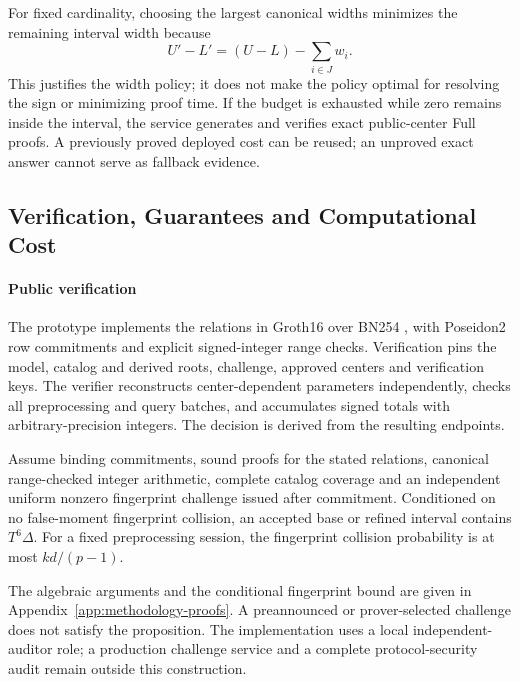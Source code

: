 For fixed cardinality, choosing the largest canonical widths minimizes the
remaining interval width because
\begin{equation}
 U'-L'=(U-L)-\sum_{i\in J}w_i.
 \label{eq:methodology-width}
\end{equation}
This justifies the width policy; it does not make the policy optimal for
resolving the sign or minimizing proof time. If the budget is exhausted
while zero remains inside the interval, the service generates and verifies
exact public-center Full proofs. A previously proved deployed cost can be
reused; an unproved exact answer cannot serve as fallback evidence.

\subsection{Verification, Guarantees and Computational Cost}
\label{sec:methodology-guarantees}
\paragraph{Public verification}
The prototype implements the relations in Groth16 over BN254
\cite{groth2016}, with Poseidon2 row commitments and explicit signed-integer
range checks. Verification pins the model, catalog and derived roots,
challenge, approved centers and verification keys. The verifier reconstructs
center-dependent parameters independently, checks all preprocessing and
query batches, and accumulates signed totals with arbitrary-precision
integers. The decision is derived from the resulting endpoints.

\begin{proposition}
\label{prop:methodology-correctness}
Assume binding commitments, sound proofs for the stated relations, canonical
range-checked integer arithmetic, complete catalog coverage and an independent
uniform nonzero fingerprint challenge issued after commitment. Conditioned on
no false-moment fingerprint collision, an accepted base or refined interval
contains $T^6\Delta$. For a fixed preprocessing session, the fingerprint
collision probability is at most $kd/(p-1)$.
\end{proposition}
The algebraic arguments and the conditional fingerprint bound are given in
Appendix~\ref{app:methodology-proofs}. A preannounced or prover-selected
challenge does not satisfy the proposition. The implementation uses a local
independent-auditor role; a production challenge service and a complete
protocol-security audit remain outside this construction.

